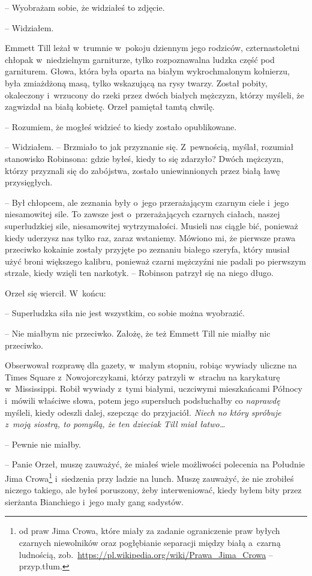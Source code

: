 \documentclass[oneside,polish,11pt,sfheadings]{mwbk}
\begin{document}
-- Wyobrażam sobie, że widziałeś to zdjęcie.

-- Widziałem.

Emmett Till leżał w~trumnie w~pokoju dziennym jego rodziców,
czternastoletni chłopak w~niedzielnym garniturze, tylko rozpoznawalna
ludzka część pod garniturem. Głowa, która była oparta na białym
wykrochmalonym kołnierzu, była zmiażdżoną masą, tylko wskazującą na rysy
twarzy. Został pobity, okaleczony i~wrzucony do rzeki przez dwóch
białych mężczyzn, którzy myśleli, że zagwizdał na białą kobietę. Orzeł
pamiętał tamtą chwilę.

-- Rozumiem, że mogłeś widzieć to kiedy zostało opublikowane.

-- Widziałem. -- Brzmiało to jak przyznanie się. Z~pewnością, myślał,
rozumiał stanowisko Robinsona: gdzie byłeś, kiedy to się zdarzyło? Dwóch
mężczyzn, którzy przyznali się do zabójstwa, zostało uniewinnionych
przez białą ławę przysięgłych.

-- Był chłopcem, ale zeznania były o~jego przerażającym czarnym ciele i~jego niesamowitej sile. To zawsze jest o~przerażających czarnych
ciałach, naszej superludzkiej sile, niesamowitej wytrzymałości. Musieli
nas ciągle bić, ponieważ kiedy uderzysz nas tylko raz, zaraz wstaniemy.
Mówiono mi, że pierwsze prawa przeciwko kokainie zostały przyjęte po
zeznaniu białego szeryfa, który musiał użyć broni większego kalibru,
ponieważ czarni mężczyźni nie padali po pierwszym strzale, kiedy wzięli
ten narkotyk. -- Robinson patrzył się na niego długo.

Orzeł się wiercił. W~końcu: 

-- Superludzka siła nie jest wszystkim, co
sobie można wyobrazić.

-- Nie miałbym nic przeciwko. Założę, że też Emmett Till nie miałby nic
przeciwko.

Obserwował rozprawę dla gazety, w~małym stopniu, robiąc wywiady uliczne
na Times Square z~Nowojorczykami, którzy patrzyli w~strachu na
karykaturę w~Mississippi. Robił wywiady z~tymi białymi, uczciwymi
mieszkańcami Północy i~mówili właściwe słowa, potem jego supersłuch
podsłuchałby co \textit{naprawdę} myśleli, kiedy odeszli dalej, szepcząc
do przyjaciół. \textit{Niech no który spróbuje z~moją siostrą, to pomyślą,
że ten dzieciak Till miał łatwo\ldots }

-- Pewnie nie miałby.

-- Panie Orzeł, muszę zauważyć, że miałeś wiele możliwości polecenia na
Południe Jima Crowa\footnote{ od praw Jima Crowa, które miały za zadanie
ograniczenie praw byłych czarnych niewolników oraz pogłębianie
separacji między białą a~czarną ludnością,
zob.~\url{https://pl.wikipedia.org/wiki/Prawa\_Jima\_Crowa} -- przyp.tłum.} i~siedzenia przy ladzie na lunch. Muszę zauważyć, że nie
zrobiłeś niczego takiego, ale byłeś poruszony, żeby interweniować, kiedy
byłem bity przez sierżanta Bianchiego i~jego mały gang sadystów.
\end{document}
